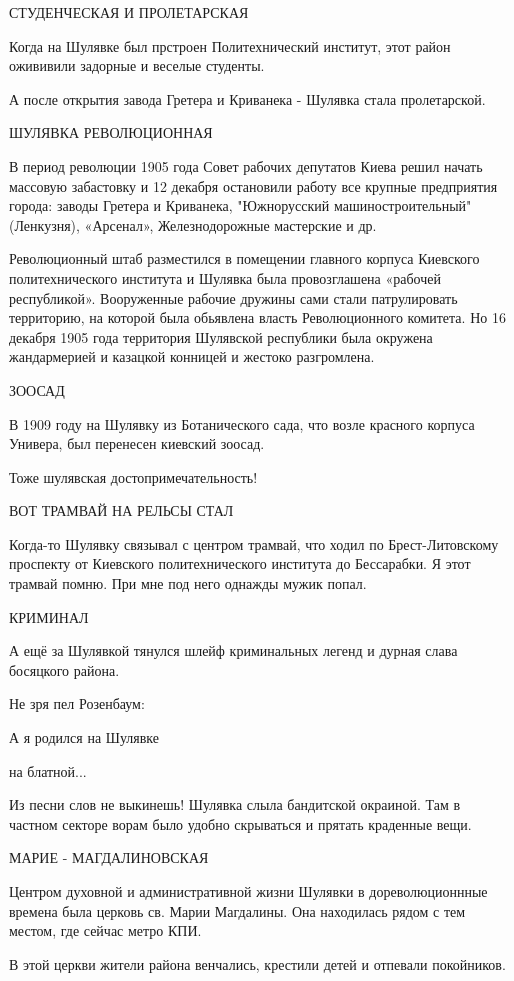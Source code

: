 СТУДЕНЧЕСКАЯ И ПРОЛЕТАРСКАЯ

Когда на Шулявке был прстроен Политехнический институт, этот район ожививили
задорные и веселые студенты.

А после открытия завода Гретера и Криванека - Шулявка стала пролетарской.

ШУЛЯВКА РЕВОЛЮЦИОННАЯ

В период революции 1905 года Совет рабочих депутатов Киева решил начать
массовую забастовку и 12 декабря остановили работу все крупные предприятия
города: заводы Гретера и Криванека, "Южнорусский машиностроительный"(Ленкузня),
«Арсенал», Железнодорожные мастерские и др.

Революционный штаб разместился в помещении главного корпуса Киевского
политехнического института и Шулявка была провозглашена «рабочей республикой».
Вооруженные рабочие дружины сами стали патрулировать территорию, на которой
была обьявлена власть Революционного комитета. Но 16 декабря 1905 года
территория Шулявской республики была окружена  жандармерией и казацкой конницей
и жестоко разгромлена. 

ЗООСАД

В 1909 году на Шулявку из Ботанического сада, что возле красного корпуса
Универа, был перенесен киевский зоосад. 

Тоже шулявская достопримечательность!

ВОТ ТРАМВАЙ НА РЕЛЬСЫ СТАЛ

Когда-то Шулявку связывал с центром трамвай, что ходил по Брест-Литовскому
проспекту от Киевского политехнического института до Бессарабки. Я этот трамвай
помню. При мне под него однажды мужик попал.

КРИМИНАЛ

А ещё за Шулявкой тянулся шлейф криминальных легенд и дурная слава босяцкого района.

Не зря пел Розенбаум:

А я родился на Шулявке

на блатной...

Из песни слов не выкинешь! Шулявка слыла бандитской окраиной. Там в частном
секторе ворам было удобно скрываться и прятать краденные вещи.

МАРИЕ - МАГДАЛИНОВСКАЯ

Центром духовной и административной жизни Шулявки в дореволюционнные времена
была церковь св. Марии Магдалины. Она находилась рядом с тем местом, где сейчас
метро КПИ.

В этой церкви жители района венчались, крестили детей и отпевали покойников.

